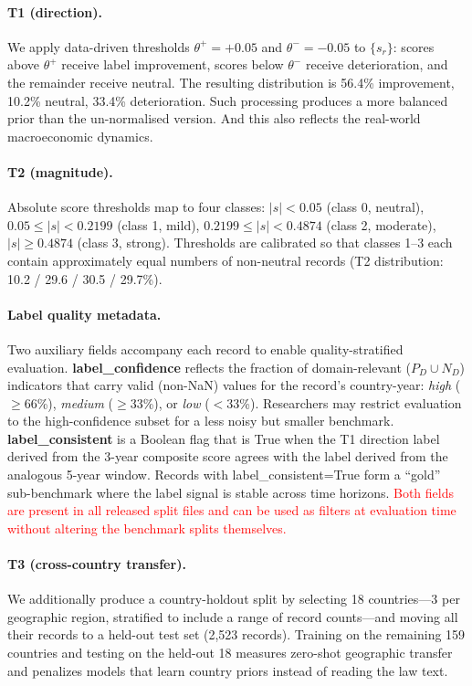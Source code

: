 \documentclass[11pt]{article}
\begin{document}
\paragraph{T1 (direction).}
We apply data-driven thresholds $\theta^{+}=+0.05$ and $\theta^{-}=-0.05$ to
$\{s_r\}$: scores above $\theta^{+}$ receive label \textsf{improvement},
scores below $\theta^{-}$ receive \textsf{deterioration}, and the remainder
receive \textsf{neutral}. The resulting distribution is 56.4\% improvement,
10.2\% neutral, 33.4\% deterioration. Such processing produces a more balanced prior than the
un-normalised version. And this also reflects the real-world macroeconomic dynamics.

\paragraph{T2 (magnitude).}
Absolute score thresholds map to four classes: $|s|<0.05$ (class 0, neutral),
$0.05 \le |s|<0.2199$ (class 1, mild), $0.2199 \le |s|<0.4874$ (class 2,
moderate), $|s|\ge0.4874$ (class 3, strong). Thresholds are calibrated
so that classes 1--3 each contain approximately equal numbers of non-neutral
records (T2 distribution: 10.2 / 29.6 / 30.5 / 29.7\%).

\paragraph{Label quality metadata.}
Two auxiliary fields accompany each record to enable quality-stratified evaluation.
\textbf{label\_confidence} reflects the fraction of domain-relevant ($P_D \cup N_D$)
indicators that carry valid (non-NaN) values for the record's country-year:
\textit{high} ($\ge$66\%), \textit{medium} ($\ge$33\%), or \textit{low} ($<$33\%).
Researchers may restrict evaluation to the high-confidence subset for a less noisy
but smaller benchmark.
\textbf{label\_consistent} is a Boolean flag that is True when
the T1 direction label derived from the 3-year composite score agrees with the
label derived from the analogous 5-year window. Records with label\_consistent=True
form a ``gold'' sub-benchmark where the label signal is stable across time horizons.
\textcolor{red}{Both fields are present in all released split files and can be used as filters at
evaluation time without altering the benchmark splits themselves.}

\paragraph{T3 (cross-country transfer).}
We additionally produce a country-holdout split by selecting 18 countries---3
per geographic region, stratified to include a range of record counts---and
moving all their records to a held-out test set (2{,}523 records). Training on
the remaining 159 countries and testing on the held-out 18 measures zero-shot
geographic transfer and penalizes models that learn country priors instead of
reading the law text.
\end{document}
